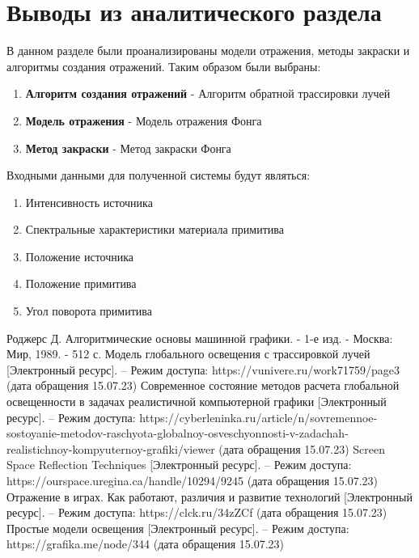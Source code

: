 \documentclass[a4paper,14pt, unknownkeysallowed]{extreport}
\begin{document}
\section{Выводы из аналитического раздела}
В данном разделе были проанализированы модели отражения, методы закраски и алгоритмы создания отражений.
Таким образом были выбраны:
\begin{enumerate}
	\item \textbf{Алгоритм создания отражений} - Алгоритм обратной трассировки лучей
	\item \textbf{Модель отражения} - Модель отражения Фонга
	\item \textbf{Метод закраски} - Метод закраски Фонга
\end{enumerate}

Входными данными для полученной системы будут являться:
\begin{enumerate}
	\item Интенсивность источника
	\item Спектральные характеристики материала примитива 
	\item Положение источника
	\item Положение примитива
	\item Угол поворота примитива
\end{enumerate}









\begin{thebibliography}{9}
	Роджерс Д. Алгоритмические основы машинной графики. - 1-е изд. - Москва: Мир, 1989. - 512 с.
	Модель глобального освещения с трассировкой лучей [Электронный ресурс]. – Режим доступа: https://vunivere.ru/work71759/page3 (дата обращения 15.07.23)
	Современное состояние методов расчета глобальной освещенности в задачах реалистичной компьютерной графики [Электронный ресурс]. – Режим доступа: https://cyberleninka.ru/article/n/sovremennoe-sostoyanie-metodov-raschyota-globalnoy-osveschyonnosti-v-zadachah-realistichnoy-kompyuternoy-grafiki/viewer (дата обращения 15.07.23)
	Screen Space Reflection Techniques [Электронный ресурс]. – Режим доступа: https://ourspace.uregina.ca/handle/10294/9245 (дата обращения 15.07.23)
	Отражение в играх. Как работают, различия и развитие технологий [Электронный ресурс]. – Режим доступа: https://clck.ru/34zZCf (дата обращения 15.07.23)
	Простые модели освещения  [Электронный ресурс]. – Режим доступа: https://grafika.me/node/344 (дата обращения 15.07.23)
\end{thebibliography}

\end{document}

